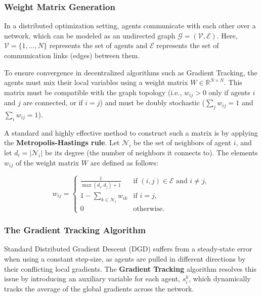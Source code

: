 \documentclass[11pt, a4paper]{article}
\begin{document}
\subsubsection*{Weight Matrix Generation}
\label{sec:topology_weights}

In a distributed optimization setting, agents communicate with each other over a network, which can be modeled as an undirected graph $\mathcal{G} = (\mathcal{V}, \mathcal{E})$. Here, $\mathcal{V} = \{1, \dots, N\}$ represents the set of agents and $\mathcal{E}$ represents the set of communication links (edges) between them. 

To ensure convergence in decentralized algorithms such as Gradient Tracking, the agents must mix their local variables using a weight matrix $W \in \mathbb{R}^{N \times N}$. This matrix must be compatible with the graph topology (i.e., $w_{ij} > 0$ only if agents $i$ and $j$ are connected, or if $i=j$) and must be doubly stochastic ($\sum_{j} w_{ij} = 1$ and $\sum_{i} w_{ij} = 1$).

A standard and highly effective method to construct such a matrix is by applying the \textbf{Metropolis-Hastings rule}. Let $\mathcal{N}_i$ be the set of neighbors of agent $i$, and let $d_i = |\mathcal{N}_i|$ be its degree (the number of neighbors it connects to). The elements $w_{ij}$ of the weight matrix $W$ are defined as follows:

\begin{equation}
    w_{ij} = 
    \begin{cases} 
    \frac{1}{\max(d_i, d_j) + 1} & \text{if } (i, j) \in \mathcal{E} \text{ and } i \neq j, \\
    1 - \sum_{k \in \mathcal{N}_i} w_{ik} & \text{if } i = j, \\
    0 & \text{otherwise.}
    \end{cases}
    \label{eq:metropolis_hastings}
\end{equation}

\subsubsection*{The Gradient Tracking Algorithm}
\label{sec:gradient_tracking}

Standard Distributed Gradient Descent (DGD) suffers from a steady-state error when using a constant step-size, as agents are pulled in different directions by their conflicting local gradients. The \textbf{Gradient Tracking} algorithm resolves this issue by introducing an auxiliary variable for each agent, $s_i^k$, which dynamically tracks the average of the global gradients across the network.
\end{document}
